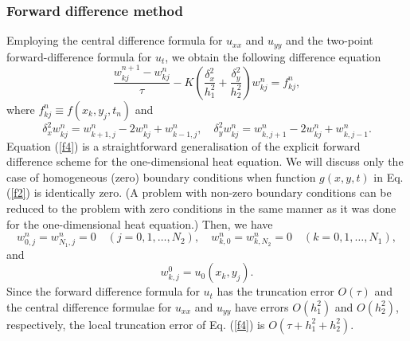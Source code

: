 \subsubsection{Forward difference method}
Employing the central
difference formula for $u_{xx}$ and $u_{yy}$
and the two-point forward-difference formula for $u_t$, we
obtain the following difference equation
\begin{equation}
\frac{w_{kj}^{n+1}-w_{kj}^{n}}{\tau} -K\left(\frac{\delta_{x}^2}{h_{1}^2}
+\frac{\delta_{y}^2}{h_{2}^2}\right)w_{kj}^{n}=f_{kj}^n, \label{f4}
\end{equation}
where $f_{kj}^n\equiv f(x_{k},y_{j},t_{n})$ and
\[
\delta_{x}^2w_{kj}^{n}=w_{k+1,j}^{n}-2w_{kj}^{n}+w_{k-1,j}^{n}, \quad
\delta_{y}^2w_{kj}^{n}=w_{k,j+1}^{n}-2w_{kj}^{n}+w_{k,j-1}^{n}.
\]
Equation (\ref{f4})
is a straightforward generalisation of the explicit forward difference
scheme for the one-dimensional heat equation. We will discuss only
the case of homogeneous (zero) boundary conditions when function
$g(x,y,t)$ in Eq. (\ref{f2}) is identically zero. (A problem with
non-zero boundary conditions can be reduced to the problem with
zero conditions in the same manner as it was done for the one-dimensional
heat equation.) Then, we have
\begin{equation}
w_{0,j}^{n}=w^{n}_{N_{1},j}=0 \quad
(j=0,1,\dots, N_{2}), \quad
w^{n}_{k,0}=w^{n}_{k,N_{2}}=0 \quad
(k=0,1,\dots, N_{1}), \label{f5}
\end{equation}
and
\begin{equation}
w^{0}_{k,j}=u_{0}(x_{k},y_{j}). \label{f6}
\end{equation}
Since the forward difference formula for $u_t$ has the truncation error
$O(\tau)$ and the central
difference formulae for
$u_{xx}$ and $u_{yy}$ have errors $O(h_{1}^2)$ and $O(h_{2}^2)$, respectively, the
local truncation error of Eq. (\ref{f4}) is $O(\tau+h_{1}^2+h_{2}^2)$.

